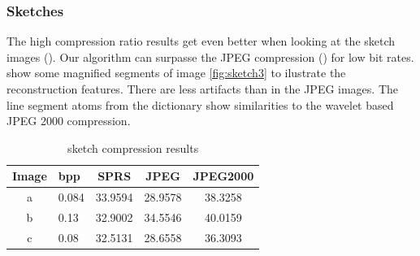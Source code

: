 \clearpage
\subsubsection{Sketches}
The high compression ratio results get even better when looking at the sketch
images (). Our algorithm can surpasse the JPEG
compression () for low bit rates.
 show some magnified segments of image
\ref{fig:sketch3} to ilustrate the reconstruction features. There are less
artifacts than in the JPEG images. The line segment atoms from the dictionary
show similarities to the wavelet based JPEG 2000 compression.


\begin{table}[H]
\centering
\begin{tabular}{| c l | c | c | c|}
\hline\hline
Image & bpp & SPRS & JPEG & JPEG2000 \\
\hline
a & 0.084 & 33.9594 & 28.9578 & 38.3258  \\
\hline
b & 0.13 & 32.9002 & 34.5546 &  40.0159 \\
\hline
c & 0.08 & 32.5131 & 28.6558 & 36.3093  \\
\hline
\end{tabular}
\caption{sketch compression results}
\label{tab:compression2}
\end{table}
